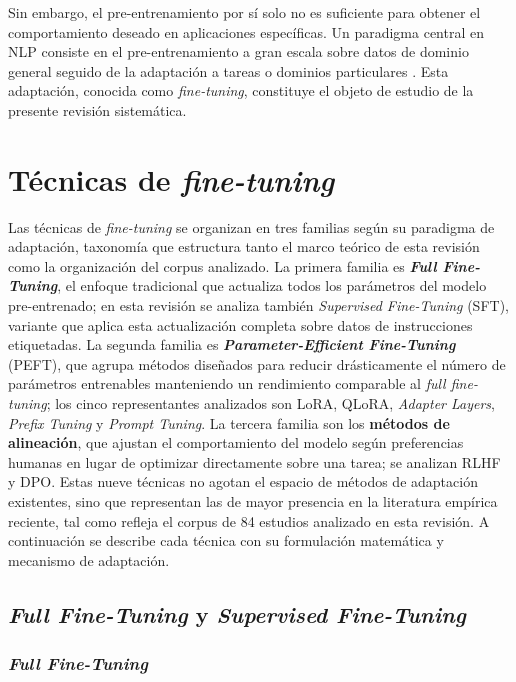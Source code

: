Sin embargo, el pre-entrenamiento por sí solo no es suficiente para obtener el comportamiento deseado en aplicaciones específicas. Un paradigma central en NLP consiste en el pre-entrenamiento a gran escala sobre datos de dominio general seguido de la adaptación a tareas o dominios particulares \parencite[p.~1]{hu2021loralowrankadaptationlarge}. Esta adaptación, conocida como \textit{fine-tuning}, constituye el objeto de estudio de la presente revisión sistemática.

\section{Técnicas de \textit{fine-tuning}}

Las técnicas de \textit{fine-tuning} se organizan en tres familias según su paradigma de adaptación, taxonomía que estructura tanto el marco teórico de esta revisión como la organización del corpus analizado. La primera familia es \textbf{\textit{Full Fine-Tuning}}, el enfoque tradicional que actualiza todos los parámetros del modelo pre-entrenado; en esta revisión se analiza también \textit{Supervised Fine-Tuning} (SFT), variante que aplica esta actualización completa sobre datos de instrucciones etiquetadas. La segunda familia es \textbf{\textit{Parameter-Efficient Fine-Tuning}} (PEFT), que agrupa métodos diseñados para reducir drásticamente el número de parámetros entrenables manteniendo un rendimiento comparable al \textit{full fine-tuning}; los cinco representantes analizados son LoRA, QLoRA, \textit{Adapter Layers}, \textit{Prefix Tuning} y \textit{Prompt Tuning}. La tercera familia son los \textbf{métodos de alineación}, que ajustan el comportamiento del modelo según preferencias humanas en lugar de optimizar directamente sobre una tarea; se analizan RLHF y DPO. Estas nueve técnicas no agotan el espacio de métodos de adaptación existentes, sino que representan las de mayor presencia en la literatura empírica reciente, tal como refleja el corpus de 84 estudios analizado en esta revisión. A continuación se describe cada técnica con su formulación matemática y mecanismo de adaptación.

\subsection{\textit{Full Fine-Tuning} y \textit{Supervised Fine-Tuning}}

\subsubsection{\textit{Full Fine-Tuning}}

